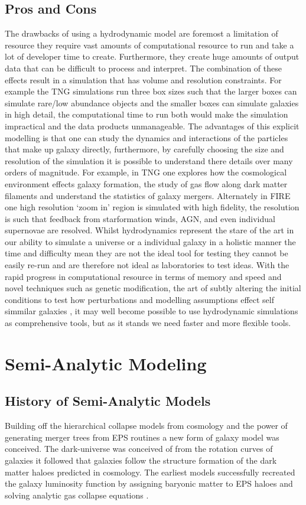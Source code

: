 \subsection{Pros and Cons}
The drawbacks of using a hydrodynamic model are foremost a limitation of resource they require vast amounts of computational resource to run and take a lot of developer time to create. Furthermore, they create huge amounts of output data that can be difficult to process and interpret. The combination of these effects result in a simulation that has volume and resolution constraints. For example the TNG simulations run three box sizes such that the larger boxes can simulate rare/low abundance objects and the smaller boxes can simulate galaxies in high detail, the computational time to run both would make the simulation impractical and the data products unmanageable. The advantages of this explicit modelling is that one can study the dynamics and interactions of the particles that make up galaxy directly, furthermore, by carefully choosing the size and resolution of the simulation it is possible to understand there details over many orders of magnitude. For example, in TNG one explores how the cosmological environment effects galaxy formation, the study of gas flow along dark matter filaments and understand the statistics of galaxy mergers. Alternately in FIRE one high resolution `zoom in' region is simulated with high fidelity, the resolution is such that feedback from starformation winds, AGN, and even individual supernovae are resolved. Whilst hydrodynamics represent the stare of the art in our ability to simulate a universe or a individual galaxy in a holistic manner the time and difficulty mean they are not the ideal tool for testing they cannot be easily re-run and are therefore not ideal as laboratories to test ideas. With the rapid progress in computational resource in terms of memory and speed and novel techniques such as genetic modification, the art of subtly altering the initial conditions to test how perturbations and modelling assumptions effect self simmilar galaxies \citep{Pontzen2017HowGalaxy}, it may well become possible to use hydrodynamic simulations as comprehensive tools, but as it stands we need faster and more flexible tools.  

\section{Semi-Analytic Modeling}
\label{sec:SAM}
\subsection{History of Semi-Analytic Models}
Building off the hierarchical collapse models from \LCDM cosmology and the power of generating merger trees from EPS routines \citep{Press1974} a new form of galaxy model was conceived. The dark-universe was conceived of from the rotation curves of galaxies it followed that galaxies follow the structure formation of the dark matter haloes predicted in \LCDM cosmology. The earliest models successfully recreated the galaxy luminosity function by assigning baryonic matter to EPS haloes and solving analytic gas collapse equations \citep{White1978CoreClustering}.


